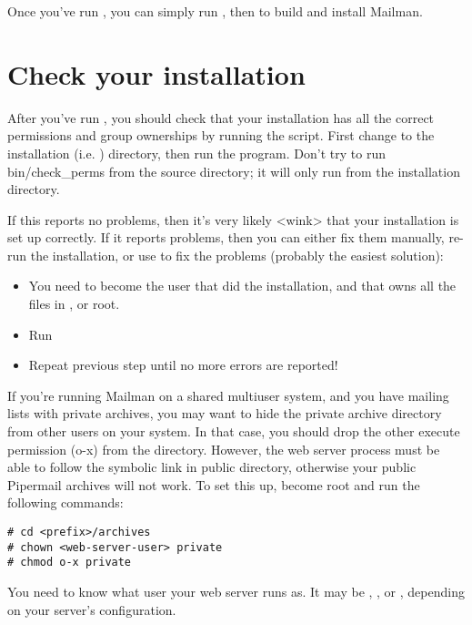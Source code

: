 \documentclass{howto}
\begin{document}
Once you've run , you can simply run , then
 to build and install Mailman.

\section{Check your installation}

After you've run , you should check that your
installation has all the correct permissions and group ownerships by running
the  script.  First change to the installation
(i.e. ) directory, then run the 
program.  Don't try to run bin/check_perms from the source directory; it will
only run from the installation directory.

If this reports no problems, then it's very likely <wink> that your
installation is set up correctly.  If it reports problems, then you can either
fix them manually, re-run the installation, or use 
to fix the problems (probably the easiest solution):

\begin{itemize}
\item You need to become the user that did the installation, and that owns all
      the files in , or root.

\item Run 

\item Repeat previous step until no more errors are reported!
\end{itemize}

\begin{notice}[warning]
If you're running Mailman on a shared multiuser system, and you have mailing
lists with private archives, you may want to hide the private archive
directory from other users on your system.  In that case, you should drop the
other execute permission (o-x) from the  directory.
However, the web server process must be able to follow the symbolic link in
public directory, otherwise your public Pipermail archives will not work.  To
set this up, become root and run the following commands:

\begin{verbatim}
# cd <prefix>/archives
# chown <web-server-user> private
# chmod o-x private
\end{verbatim}

You need to know what user your web server runs as.  It may be ,
,  or , depending on your server's
configuration.
\end{notice}
\end{document}
